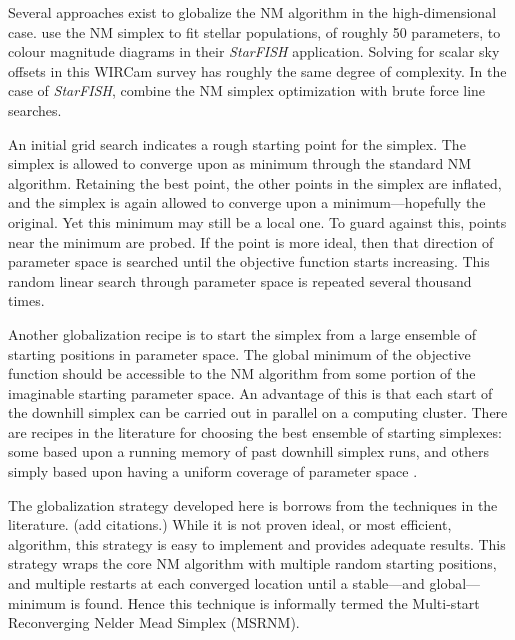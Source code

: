 \documentclass[iop]{emulateapj}
\newcommand{\eg}{\textit{e.g.,~}}
\newcommand{\sw}[1]{\textit{#1}} %
\newcommand{\todo}[1]{\textcolor{BurntOrange}{\textsf{#1}}} %
\begin{document}
Several approaches exist to globalize the NM algorithm in the high-dimensional case.
\cite{Harris:2001} use the NM simplex to fit stellar populations, of roughly 50 parameters, to colour magnitude diagrams in their \sw{StarFISH} application.
Solving for scalar sky offsets in this WIRCam survey has roughly the same degree of complexity.
In the case of \sw{StarFISH}, \citeauthor{Harris:2001} combine the NM simplex optimization with brute force line searches.

An initial grid search indicates a rough starting point for the simplex.
The simplex is allowed to converge upon as minimum through the standard NM algorithm.
Retaining the best point, the other points in the simplex are inflated, and the simplex is again allowed to converge upon a minimum---hopefully the original.
Yet this minimum may still be a local one.
To guard against this, points near the minimum are probed.
If the point is more ideal, then that direction of parameter space is searched until the objective function starts increasing.
This random linear search through parameter space is repeated several thousand times.

Another globalization recipe is to start the simplex from a large ensemble of starting positions in parameter space. The global minimum of the objective function should be accessible to the NM algorithm from some portion of the imaginable starting parameter space. An advantage of this is that each start of the downhill simplex can be carried out in parallel on a computing cluster. There are recipes in the literature for choosing the best ensemble of starting simplexes: some based upon a running memory of past downhill simplex runs, and others simply based upon having a uniform coverage of parameter space \citep[\eg][]{Luersen:2004,Wolff:2004}.

The globalization strategy developed here is borrows from the techniques in the literature.
\todo{(add citations.)}
While it is not proven ideal, or most efficient, algorithm, this strategy is easy to implement and provides adequate results.
This strategy wraps the core NM algorithm with multiple random starting positions, and multiple restarts at each converged location until a stable---and global---minimum is found.
Hence this technique is informally termed the Multi-start Reconverging Nelder Mead Simplex (MSRNM).
\end{document}
